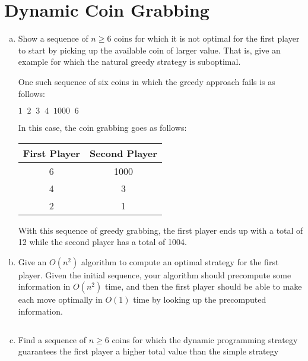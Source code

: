 \documentclass[12pt]{article}
\begin{document}
\maketitle

\section{Dynamic Coin Grabbing}\label{coin grabbing}
\begin{enumerate}[(a)]
\item Show a sequence of $n \geq 6$ coins for which it is not optimal for the first player to start by picking up the available coin of larger value. That is, give an example for which the natural greedy strategy is suboptimal.
\begin{addmargin}[2em]{2em}
One such sequence of six coins in which the greedy approach fails is as follows:
\begin{center}
$1 \;\; 2 \;\; 3 \;\; 4 \;\; 1000 \;\; 6$
\end{center}
In this case, the coin grabbing goes as follows:
\begin{center}
\begin{tabular}{c || c}
First Player & Second Player \\
\hline
6 & 1000 \\
4 & 3 \\
2 & 1 \\
\end{tabular}
\end{center}
With this sequence of greedy grabbing, the first player ends up with a total of 12 while the second player has a total of 1004.
\end{addmargin}
\item Give an $O(n^2)$ algorithm to compute an optimal strategy for the first player. Given the initial sequence,
your algorithm should precompute some information in $O(n^2)$ time, and then the first player should be
able to make each move optimally in $O(1)$ time by looking up the precomputed information.
\begin{addmargin}[2em]{2em}
\begin{lstlisting}

\end{lstlisting}
\end{addmargin}
\item Find a sequence of $n \geq 6$ coins for which the dynamic programming strategy guarantees the first player a higher total value than the simple strategy
\begin{addmargin}[2em]{2em}

\end{addmargin}
\end{enumerate}
\end{document}
